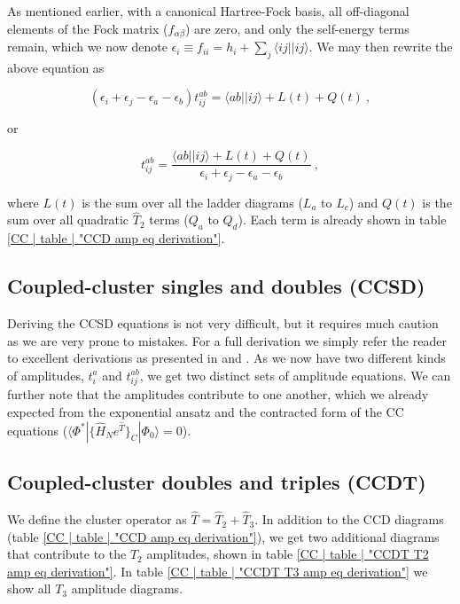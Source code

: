 	As mentioned earlier, with a canonical Hartree-Fock basis, all off-diagonal elements of the Fock matrix ($f_{\alpha\beta}$) are zero, and only the self-energy terms remain, which we now denote $\epsilon_i \equiv f_{ii} = h_i + \sum_{j}\langle ij||ij\rangle$. We may then rewrite the above equation as
	
	\begin{equation}
		(\epsilon_i+\epsilon_j-\epsilon_a-\epsilon_b)t_{ij}^{ab} = \langle ab||ij\rangle + L(t) + Q(t) \:,
	\end{equation}
	
	\noindent or
	
	\begin{equation}
		t_{ij}^{ab} = \frac{\langle ab||ij\rangle + L(t) + Q(t)}{\epsilon_i+\epsilon_j-\epsilon_a-\epsilon_b} \:,
		\label{CC | eq | "CCD amplitudes equation"}
	\end{equation}
	
	\noindent where $L(t)$ is the sum over all the ladder diagrams ($L_a$ to $L_c$) and $Q(t)$ is the sum over all quadratic $\hat{T}_2$ terms ($Q_a$ to $Q_d$). Each term is already shown in table \ref{CC | table | "CCD amp eq derivation"}.
	
	\subsection{Coupled-cluster singles and doubles (CCSD)}
	Deriving the CCSD equations is not very difficult, but it requires much caution as we are very prone to mistakes. For a full derivation we simply refer the reader to excellent derivations as presented in \cite{ShavittBartlett09} and \cite{Hansen15}. As we now have two different kinds of amplitudes, $t_i^a$ and $t_{ij}^{ab}$, we get two distinct sets of amplitude equations. We can further note that the amplitudes contribute to one another, which we already expected from the exponential ansatz and the contracted form of the CC equations ($\langle\Phi^*|\{\hat{H}_Ne^{\hat{T}}\}_C|\Phi_0\rangle = 0$).
	
	\subsection{Coupled-cluster doubles and triples (CCDT)}
	We define the cluster operator as $\hat{T} = \hat{T}_2 + \hat{T}_3$. In addition to the CCD diagrams (table \ref{CC | table | "CCD amp eq derivation"}), we get two additional diagrams that contribute to the $T_2$ amplitudes, shown in table \ref{CC | table | "CCDT T2 amp eq derivation"}. In table \ref{CC | table | "CCDT T3 amp eq derivation"} we show all $T_3$ amplitude diagrams.
	
